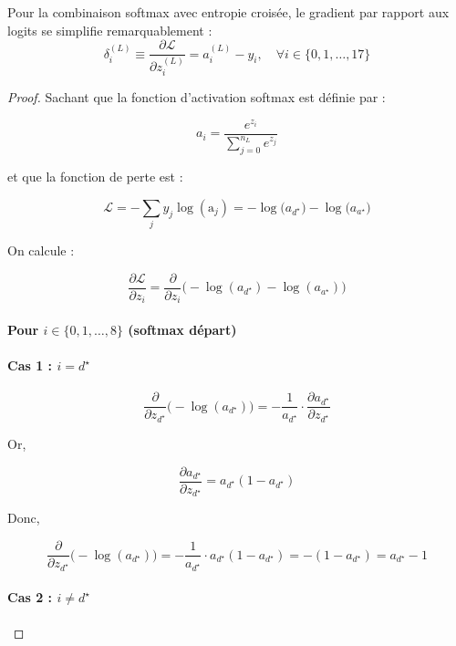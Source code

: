 \documentclass[12pt,a4paper]{report}
\numberwithin{equation}{section}
\begin{document}

\begin{theorem}
Pour la combinaison softmax avec entropie croisée, le gradient par rapport aux logits se simplifie remarquablement :
$$\delta^{(L)}_i \equiv \frac{\partial \mathcal{L}}{\partial z^{(L)}_i} = a^{(L)}_i - y_i, \quad \forall i \in \{0, 1, \ldots, 17\}$$
\end{theorem}

\begin{proof}

Sachant que la fonction d'activation softmax est définie par :

$$a_i = \frac{e^{z_i}}{\sum_{j=0}^{n_L} e^{z_j}}$$

et que la fonction de perte est :

$$\mathcal{L} = -\sum_{j} y_j \log(\text{a}_j) =-\log\big(a_{d^\star}\big) - \log\big(a_{a^\star}\big)$$


On calcule :

$$\frac{\partial \mathcal{L}}{\partial z_i} 
= \frac{\partial}{\partial z_i} \Big( -\log(a_{d^\star}) - \log(a_{a^\star}) \Big)$$

\paragraph{Pour $i \in \{0, 1, \ldots, 8\}$ (softmax départ)}

\paragraph{Cas 1 : $i = d^\star$}

$$\frac{\partial}{\partial z_{d^\star}} \big(-\log(a_{d^\star})\big) 
= - \frac{1}{a_{d^\star}} \cdot \frac{\partial a_{d^\star}}{\partial z_{d^\star}}$$

Or,

$$\frac{\partial a_{d^\star}}{\partial z_{d^\star}} 
= a_{d^\star}(1 - a_{d^\star})$$

Donc,

$$\frac{\partial}{\partial z_{d^\star}} \big(-\log(a_{d^\star})\big)
= - \frac{1}{a_{d^\star}} \cdot a_{d^\star}(1 - a_{d^\star})
= -(1 - a_{d^\star})
= a_{d^\star} - 1$$

\paragraph{Cas 2 : $i \neq d^\star$}


\end{proof}
\end{document}
